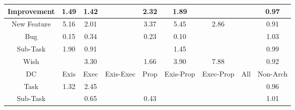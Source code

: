 \begin{tabular}{|c||c|c|c|c|c|c|c|c|}
\hline
Improvement & \cellcolor[rgb]{0.8999250470412495,0.8352276538616444,0.42} 1.49 & \cellcolor[rgb]{0.9013617140322333,0.8359081803310577,0.42} 1.42 &  & \cellcolor[rgb]{0.8830223756807825,0.8272211253224758,0.42} 2.32 & \cellcolor[rgb]{0.891822705230715,0.8313897024777072,0.42} 1.89 &  &  & \cellcolor[rgb]{0.9057462407183009,0.8198655393999574,0.4160298246704141} 0.97 \\ 
\hline
New Feature & \cellcolor[rgb]{0.8249162629518509,0.7996971771877188,0.42} 5.16 & \cellcolor[rgb]{0.889219608539533,0.8301566566766209,0.42} 2.01 &  & \cellcolor[rgb]{0.8615633813754434,0.8170563385462627,0.42} 3.37 & \cellcolor[rgb]{0.8188869186556615,0.796841171994787,0.42} 5.45 & \cellcolor[rgb]{0.8718698787984795,0.8219383636413851,0.42} 2.86 &  & \cellcolor[rgb]{0.8957552808434233,0.7725749959922031,0.406704928787195} 0.91 \\ 
\hline
Bug & \cellcolor[rgb]{0.7796694660651804,0.2231021393751872,0.2983581683275017} 0.15 & \cellcolor[rgb]{0.8088569878026054,0.3612564089323321,0.3255998552824317} 0.34 &  & \cellcolor[rgb]{0.7918161150677744,0.28059627798746545,0.3096950407299228} 0.23 & \cellcolor[rgb]{0.7719859559454644,0.18673352480853134,0.29118689221576677} 0.10 &  &  & \cellcolor[rgb]{0.9093010123257139,0.8396689005753382,0.42} 1.03 \\ 
\hline
Sub-Task & \cellcolor[rgb]{0.8914855068213919,0.8312299769153961,0.42} 1.90 & \cellcolor[rgb]{0.8965298972882904,0.7762415138312406,0.4074279041357376} 0.91 &  &  & \cellcolor[rgb]{0.9008216107368512,0.8356523419279821,0.42} 1.45 &  &  & \cellcolor[rgb]{0.9090331029843476,0.8354233541259117,0.419097562785391} 0.99 \\ 
\hline
Wish &  & \cellcolor[rgb]{0.8628106635380776,0.8176471564127736,0.42} 3.30 &  & \cellcolor[rgb]{0.896392304635439,0.8335542495641552,0.42} 1.66 & \cellcolor[rgb]{0.8505344369078643,0.8118321016931989,0.42} 3.90 & \cellcolor[rgb]{0.769072582399224,0.773244907452264,0.42} 7.88 &  & \cellcolor[rgb]{0.8972227554349801,0.7795210423922387,0.40807457173931466} 0.92 \\ 
\hline
\hline
DC & Exis & Exec & Exis-Exec & Prop & Exis-Prop & Exec-Prop & All & Non-Arch \\ 
\hline
Task & \cellcolor[rgb]{0.903389797845955,0.8368688516112417,0.42} 1.32 & \cellcolor[rgb]{0.8802397968410427,0.8259030616615466,0.42} 2.45 &  &  &  &  &  & \cellcolor[rgb]{0.9042608264232729,0.8128345784034916,0.41464343799505465} 0.96 \\ 
\hline
Sub-Task &  & \cellcolor[rgb]{0.8557184809278697,0.5830674763919164,0.36933724886601166} 0.65 &  & \cellcolor[rgb]{0.8218865435523959,0.4229296394813407,0.3377607739822362} 0.43 &  &  &  & \cellcolor[rgb]{0.9097946323913323,0.8399027206064206,0.42} 1.01 \\ 

\end{tabular}
